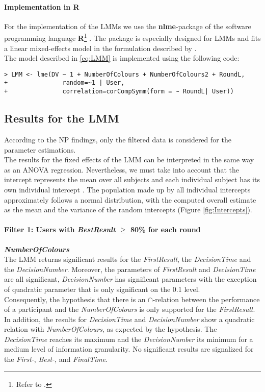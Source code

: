 \paragraph{Implementation in R}
For the implementation of the \ac{LMM}s we use the \textbf{nlme}-package of the software programming language \textbf{R}\footnote{Refer to \cite{R2012}.} . The package is especially designed for \ac{LMM}s  \citep{Pinheiro2013} and fits a linear mixed-effects model in the formulation described by \cite{Laird1982}.\\
The model described in \ref{eq:LMM} is implemented using the following code:
\begin{verbatim}
> LMM <- lme(DV ~ 1 + NumberOfColours + NumberOfColours2 + RoundL, 
+               random=~1 | User, 
+               correlation=corCompSymm(form = ~ RoundL| User))
\end{verbatim}

\subsection{Results for the \ac{LMM}}

According to the \acl{NP} findings, only the filtered data is considered for the parameter estimations.\\
The results for the fixed effects of the \ac{LMM} can be interpreted in the same way as an ANOVA regression. Nevertheless, we must take into account that the intercept represents the mean over all subjects and each individual subject has its own individual intercept \citep{Seltman2012}. The population made up by all individual intercepts approximately follows a normal distribution, with the computed overall estimate as the mean and the variance of the random intercepts (Figure \ref{fig:Intercepts}).

\paragraph{Filter 1: Users with \textit{BestResult} $\geq$ 80\% for each round}
\textbf{\textit{NumberOfColours} }\\
The \ac{LMM} returns significant results for the \textit{FirstResult}, the \textit{DecisionTime} and the \textit{DecisionNumber}.  Moreover, the parameters of \textit{FirstResult}  and \textit{DecisionTime} are all significant, \textit{DecisionNumber} has significant parameters with the exception of quadratic parameter that is only significant on the 0.1 level. \\
Consequently, the hypothesis that there is an \textbf{$\cap$}-relation between the performance of a participant and the \textit{NumberOfColours} is only supported for the \textit{FirstResult}. In addition, the results for \textit{DecisionTime} and \textit{DecisionNumber} show a quadratic relation with \textit{NumberOfColours}, as expected by the hypothesis. The \textit{DecisionTime} reaches its maximum and the \textit{DecisionNumber} its minimum for a medium level of information granularity. No significant results are signalized for the \textit{First-}, \textit{Best-}, and \textit{FinalTime}.

